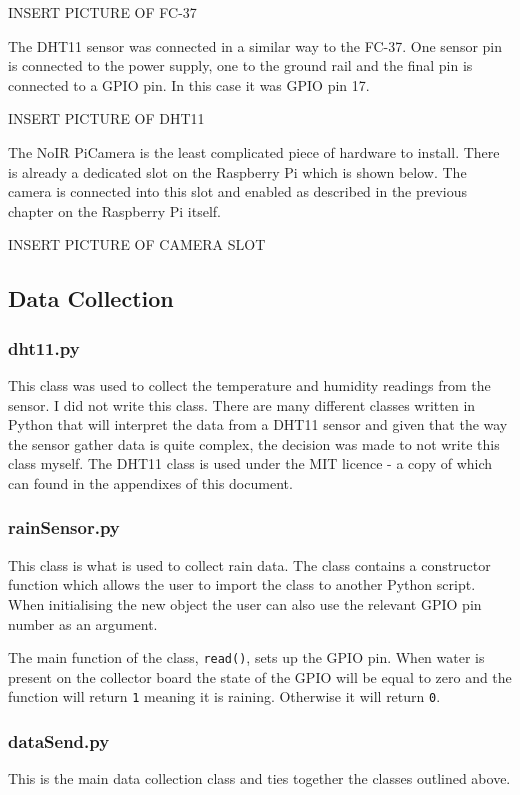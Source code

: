 \documentclass[10pt,a4paper]{article}
\begin{document}
INSERT PICTURE OF FC-37

The DHT11 sensor was connected in a similar way to the FC-37. One sensor pin is connected to the power supply, one to the ground rail and the final pin is connected to a GPIO pin. In this case it was GPIO pin 17. 

INSERT PICTURE OF DHT11

The NoIR PiCamera is the least complicated piece of hardware to install. There is already a dedicated slot on the Raspberry Pi which is shown below. The camera is connected into this slot and enabled as described in the previous chapter on the Raspberry Pi itself. 

INSERT PICTURE OF CAMERA SLOT

\subsection{Data Collection}
\subsubsection{dht11.py}
This class was used to collect the temperature and humidity readings from the sensor. I did not write this class. There are many different classes written in Python that will interpret the data from a DHT11 sensor and given that the way the sensor gather data is quite complex, the decision was made to not write this class myself. The DHT11 class is used under the MIT licence - a copy of which can found in the appendixes of this document. 

\subsubsection{rainSensor.py}
This class is what is used to collect rain data. The class contains a constructor function which allows the user to import the class to another Python script. When initialising the new object the user can also use the relevant GPIO pin number as an argument. 

The main function of the class, \texttt{read()}, sets up the GPIO pin. When water is present on the collector board the state of the GPIO will be equal to zero and the function will return \texttt{1} meaning it is raining. Otherwise it will return \texttt{0}. 

\subsubsection{dataSend.py}
This is the main data collection class and ties together the classes outlined above. 
\end{document}
